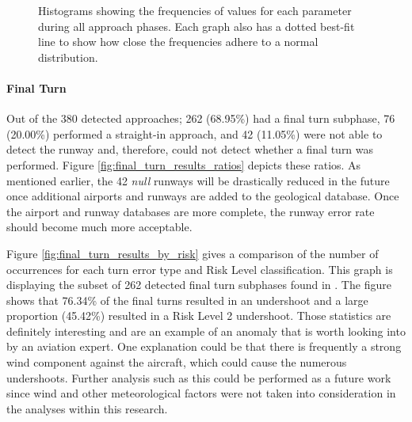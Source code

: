         \begin{figure}
        	\centering
            \hfill%
            
            \hfill%
            \caption{Histograms showing the frequencies of values for each parameter during all approach phases.  Each graph also has a dotted best-fit line to show how close the frequencies adhere to a normal distribution.}
            \label{fig:approach_histograms}
        \end{figure}
    
    
        \paragraph{Final Turn}
        
        	Out of the 380 detected approaches; 262 (68.95\%) had a final turn subphase, 76 (20.00\%) performed a straight-in approach, and 42 (11.05\%) were not able to detect the runway and, therefore, could not detect whether a final turn was performed.  Figure \ref{fig:final_turn_results_ratios} depicts these ratios.  As mentioned earlier, the 42 \textit{null} runways will be drastically reduced in the future once additional airports and runways are added to the geological database.  Once the airport and runway databases are more complete, the runway error rate should become much more acceptable.
            
            Figure \ref{fig:final_turn_results_by_risk} gives a comparison of the number of occurrences for each turn error type and Risk Level classification.  This graph is displaying the subset of 262 detected final turn subphases found in .  The figure shows that 76.34\% of the final turns resulted in an undershoot and a large proportion (45.42\%) resulted in a Risk Level 2 undershoot.  Those statistics are definitely interesting and are an example of an anomaly that is worth looking into by an aviation expert.  One explanation could be that there is frequently a strong wind component against the aircraft, which could cause the numerous undershoots.  Further analysis such as this could be performed as a future work since wind and other meteorological factors were not taken into consideration in the analyses within this research.
            
